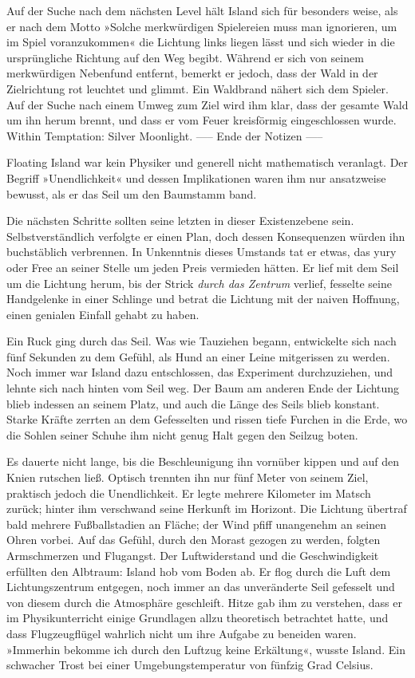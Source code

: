     Auf der Suche nach dem nächsten Level hält Island sich für besonders weise, als er nach dem Motto »Solche merkwürdigen Spielereien muss man ignorieren, um im Spiel voranzukommen« die Lichtung links liegen lässt und sich wieder in die ursprüngliche Richtung auf den Weg begibt. Während er sich von seinem merkwürdigen Nebenfund entfernt, bemerkt er jedoch, dass der Wald in der Zielrichtung rot leuchtet und glimmt. Ein Waldbrand nähert sich dem Spieler. Auf der Suche nach einem Umweg zum Ziel wird ihm klar, dass der gesamte Wald um ihn herum brennt, und dass er vom Feuer kreisförmig eingeschlossen wurde.
    Within Temptation: Silver Moonlight.
----- Ende der Notizen -----

Floating Island war kein Physiker und generell nicht mathematisch veranlagt. Der Begriff »Unendlichkeit« und dessen Implikationen waren ihm nur ansatzweise bewusst, als er das Seil um den Baumstamm band.

Die nächsten Schritte sollten seine letzten in dieser Existenzebene sein. Selbstverständlich verfolgte er einen Plan, doch dessen Konsequenzen würden ihn buchstäblich verbrennen. In Unkenntnis dieses Umstands tat er etwas, das yury oder Free an seiner Stelle um jeden Preis vermieden hätten. Er lief mit dem Seil um die Lichtung herum, bis der Strick \emph{durch das Zentrum} verlief, fesselte seine Handgelenke in einer Schlinge und betrat die Lichtung mit der naiven Hoffnung, einen genialen Einfall gehabt zu haben.

Ein Ruck ging durch das Seil. Was wie Tauziehen begann, entwickelte sich nach fünf Sekunden zu dem Gefühl, als Hund an einer Leine mitgerissen zu werden. Noch immer war Island dazu entschlossen, das Experiment durchzuziehen, und lehnte sich nach hinten vom Seil weg. Der Baum am anderen Ende der Lichtung blieb indessen an seinem Platz, und auch die Länge des Seils blieb konstant. Starke Kräfte zerrten an dem Gefesselten und rissen tiefe Furchen in die Erde, wo die Sohlen seiner Schuhe ihm nicht genug Halt gegen den Seilzug boten.

Es dauerte nicht lange, bis die Beschleunigung ihn vornüber kippen und auf den Knien rutschen ließ. Optisch trennten ihn nur fünf Meter von seinem Ziel, praktisch jedoch die Unendlichkeit. Er legte mehrere Kilometer im Matsch zurück; hinter ihm verschwand seine Herkunft im Horizont. Die Lichtung übertraf bald mehrere Fußballstadien an Fläche; der Wind pfiff unangenehm an seinen Ohren vorbei. Auf das Gefühl, durch den Morast gezogen zu werden, folgten Armschmerzen und Flugangst. Der Luftwiderstand und die Geschwindigkeit erfüllten den Albtraum: Island hob vom Boden ab. Er flog durch die Luft dem Lichtungszentrum entgegen, noch immer an das unveränderte Seil gefesselt und von diesem durch die Atmosphäre geschleift. Hitze gab ihm zu verstehen, dass er im Physikunterricht einige Grundlagen allzu theoretisch betrachtet hatte, und dass Flugzeugflügel wahrlich nicht um ihre Aufgabe zu beneiden waren. »Immerhin bekomme ich durch den Luftzug keine Erkältung«, wusste Island. Ein schwacher Trost bei einer Umgebungstemperatur von fünfzig Grad Celsius.

